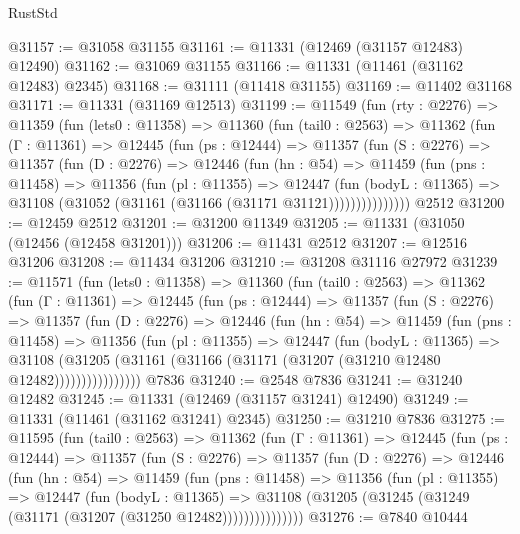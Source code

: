 \begin{lexlean}{RustStd}
\begin{coremodule}
@31157 := @31058 @31155
@31161 := @11331 (@12469 (@31157 @12483) @12490)
@31162 := @31069 @31155
@31166 := @11331 (@11461 (@31162 @12483) @2345)
@31168 := @31111 (@11418 @31155)
@31169 := @11402 @31168
@31171 := @11331 (@31169 @12513)
@31199 := @11549
    (fun (rty : @2276) =>
    @11359
      (fun (lets0 : @11358) =>
      @11360
        (fun (tail0 : @2563) =>
        @11362
          (fun (Γ : @11361) =>
          @12445
            (fun (ps : @12444) =>
            @11357
              (fun (S : @2276) =>
              @11357
                (fun (D : @2276) =>
                @12446
                  (fun (hn : @54) =>
                  @11459
                    (fun (pns : @11458) =>
                    @11356
                      (fun (pl : @11355) =>
                      @12447
                        (fun (bodyL : @11365) =>
                        @31108 (@31052 (@31161 (@31166 (@31171 @31121)))))))))))))))
    @2512
@31200 := @12459 @2512
@31201 := @31200 @11349
@31205 := @11331 (@31050 (@12456 (@12458 @31201)))
@31206 := @11431 @2512
@31207 := @12516 @31206
@31208 := @11434 @31206
@31210 := @31208 @31116 @27972
@31239 := @11571
    (fun (lets0 : @11358) =>
    @11360
      (fun (tail0 : @2563) =>
      @11362
        (fun (Γ : @11361) =>
        @12445
          (fun (ps : @12444) =>
          @11357
            (fun (S : @2276) =>
            @11357
              (fun (D : @2276) =>
              @12446
                (fun (hn : @54) =>
                @11459
                  (fun (pns : @11458) =>
                  @11356
                    (fun (pl : @11355) =>
                    @12447
                      (fun (bodyL : @11365) =>
                      @31108
                        (@31205
                          (@31161 (@31166 (@31171 (@31207 (@31210 @12480 @12482))))))))))))))))
    @7836
@31240 := @2548 @7836
@31241 := @31240 @12482
@31245 := @11331 (@12469 (@31157 @31241) @12490)
@31249 := @11331 (@11461 (@31162 @31241) @2345)
@31250 := @31210 @7836
@31275 := @11595
    (fun (tail0 : @2563) =>
    @11362
      (fun (Γ : @11361) =>
      @12445
        (fun (ps : @12444) =>
        @11357
          (fun (S : @2276) =>
          @11357
            (fun (D : @2276) =>
            @12446
              (fun (hn : @54) =>
              @11459
                (fun (pns : @11458) =>
                @11356
                  (fun (pl : @11355) =>
                  @12447
                    (fun (bodyL : @11365) =>
                    @31108 (@31205 (@31245 (@31249 (@31171 (@31207 (@31250 @12482)))))))))))))))
@31276 := @7840 @10444

\end{coremodule}
\end{lexlean}

